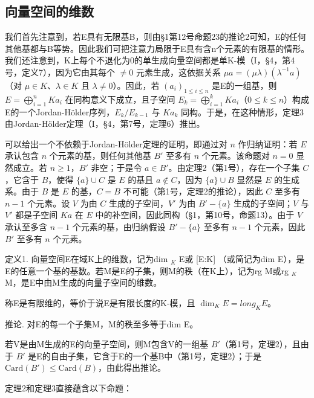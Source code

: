 \subsection{向量空间的维数}


我们首先注意到，若E具有无限基B，则由§1第12号命题23的推论2可知，E的任何其他基都与B等势。因此我们可把注意力局限于E具有含n个元素的有限基的情形。我们还注意到，K上每个不退化为0的单生成向量空间都是单K-模（I，§4，第4号，定义7），因为它由其每个 \(\neq0\) 元素生成，这依据关系 \(\mu a = (\mu \lambda)(\lambda^{-1}a)\)（对 \(\mu \in K\)、\(\lambda \in K\) 且 \(\lambda \neq 0\)）。因此，若 \((a_{i})_{1 \leqslant i \leqslant n}\) 是E的一组基，则 \(E = \bigoplus_{i=1}^{n} Ka_{i}\) 在同构意义下成立，且子空间 \(E_{k} = \bigoplus_{i=1}^{k} Ka_{i}\)（\(0 \leqslant k \leqslant n\)）构成E的一个Jordan-Hölder序列，\(E_{k}/E_{k-1}\) 与 \(Ka_{k}\) 同构。于是，在这种情形，定理3由Jordan-Hölder定理（I，§4，第7号，定理6）推出。

可以给出一个不依赖于Jordan-Hölder定理的证明，即通过对 \(n\) 作归纳证明：若 \(E\) 承认包含 \(n\) 个元素的基，则任何其他基 \(B'\) 至多有 \(n\) 个元素。该命题对 \(n = 0\) 显然成立。若 \(n \geqslant 1\)，\(B'\) 非空；于是令 \(a \in B'\)。由定理2（第1号），存在一个子集 \(C\)，它含于 \(B\)，使得 \(\{a\} \cup C\) 是 \(E\) 的基且 \(a \notin C\)，因为 \(\{a\} \cup B\) 显然是 \(E\) 的生成系。由于 \(B\) 是 \(E\) 的基，\(C = B\) 不可能（第1号，定理2的推论），因此 \(C\) 至多有 \(n - 1\) 个元素。设 \(V\) 为由 \(C\) 生成的子空间，\(V'\) 为由 \(B' - \{a\}\) 生成的子空间；\(V\) 与 \(V'\) 都是子空间 \(Ka\) 在 \(E\) 中的补空间，因此同构（§1，第10号，命题13）。由于 \(V\) 承认至多含 \(n - 1\) 个元素的基，由归纳假设 \(B' - \{a\}\) 至多有 \(n - 1\) 个元素，因此 \(B'\) 至多有 \(n\) 个元素。

定义1. 向量空间E在域K上的维数，记为dim \(_{K}\) E或 {[}E:K{]} （或简记为dim E），是E的任意一个基的基数。若M是E的子集，则M的秩（在K上），记为rg M或rg \(_{K}\) M，是E中由M生成的向量子空间的维数。

称E是有限维的，等价于说E是有限长度的K-模，且 \(\dim_{K}E = long_{K}E\)。

推论. 对E的每一个子集M，M的秩至多等于dim E。

若V是由M生成的E的向量子空间，则M包含V的一组基 \(B'\)（第1号，定理2），且由于 \(B'\) 是E的自由子集，它含于E的一个基B中（第1号，定理2）；于是 \(\text{Card}(B') \leqslant \text{Card}(B)\)，由此得出推论。

定理2和定理3直接蕴含以下命题：

